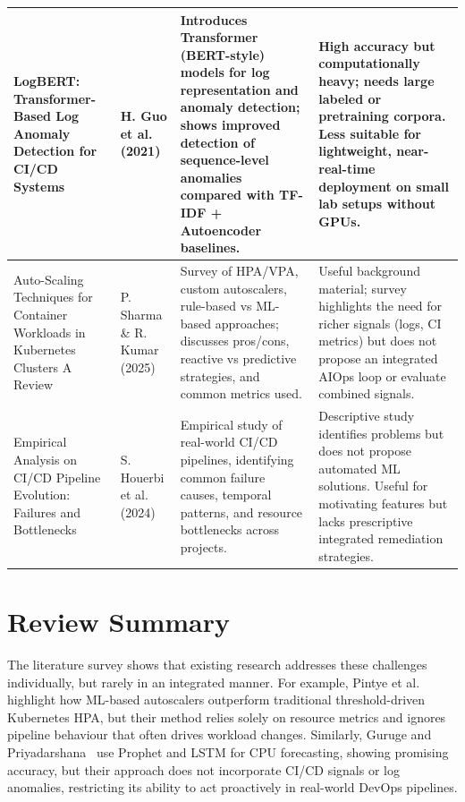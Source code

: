 \documentclass[a4paper,14pt,onecolumn]{report}
\begin{document}
\begin{longtable}{|p{3.9cm}|p{2.9cm}|p{4.0cm}|p{3.4cm}|}
LogBERT: Transformer-Based Log Anomaly Detection for CI/CD Systems~\cite{guo2021} &
H. Guo et al. (2021) &
Introduces Transformer (BERT-style) models for log representation and anomaly detection; shows improved detection of sequence-level anomalies compared with TF-IDF + Autoencoder baselines. &
High accuracy but computationally heavy; needs large labeled or pretraining corpora. Less suitable for lightweight, near-real-time deployment on small lab setups without GPUs.\\
\hline

Auto-Scaling Techniques for Container Workloads in Kubernetes Clusters A Review~\cite{sharma2025} &
P. Sharma \& R. Kumar (2025) &
Survey of HPA/VPA, custom autoscalers, rule-based vs ML-based approaches; discusses pros/cons, reactive vs predictive strategies, and common metrics used. &
Useful background material; survey highlights the need for richer signals (logs, CI metrics) but does not propose an integrated AIOps loop or evaluate combined signals. \\
\hline

Empirical Analysis on CI/CD Pipeline Evolution: Failures and Bottlenecks~\cite{houerbi2024} &
S. Houerbi et al. (2024) &
Empirical study of real-world CI/CD pipelines, identifying common failure causes, temporal patterns, and resource bottlenecks across projects. &
Descriptive study identifies problems but does not propose automated ML solutions. Useful for motivating features but lacks prescriptive integrated remediation strategies. \\
\hline


\end{longtable}

\section{Review Summary}

The literature survey shows that existing research addresses these challenges individually, but rarely in an integrated manner. For example, Pintye et al.~\cite{pintye2024} highlight how ML-based autoscalers outperform traditional threshold-driven Kubernetes HPA, but their method relies solely on resource metrics and ignores pipeline behaviour that often drives workload changes. Similarly, Guruge and Priyadarshana~\cite{guruge2025} use Prophet and LSTM for CPU forecasting, showing promising accuracy, but their approach does not incorporate CI/CD signals or log anomalies, restricting its ability to act proactively in real-world DevOps pipelines.
\end{document}
